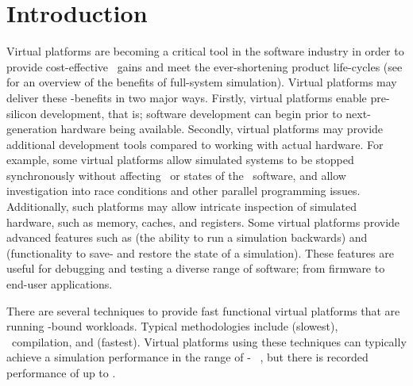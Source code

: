 
\chapter{Introduction}
\label{cha:introduction}

Virtual platforms are becoming a critical tool in the software industry in order to provide cost-effective \dvttermttm\ gains and meet the ever-shortening product life-cycles (see  for an overview of the benefits of full-system simulation).
Virtual platforms may deliver these \dvttermttm -benefits in two major ways.
Firstly, virtual platforms enable pre-silicon development, that is; software development can begin prior to next-generation hardware being available.
Secondly, virtual platforms may provide additional development tools compared to working with actual hardware.
For example, some virtual platforms allow simulated systems to be stopped synchronously without affecting \dvttermtiming\ or states of the \dvttermtarget\ software, and allow investigation into race conditions and other parallel programming issues.
Additionally, such platforms may allow intricate inspection of simulated hardware, such as memory, caches, and registers.
Some virtual platforms provide advanced features such as \dvttermreverseexecution {} (the ability to run a simulation backwards) and \dvttermcheckpointing {} (functionality to save- and restore the state of a simulation).
These features are useful for debugging and testing a diverse range of software; from firmware to end-user applications.

There are several techniques to provide fast functional virtual platforms that are running \dvttermcpu -bound workloads. Typical methodologies include \dvtterminterpretation {} (slowest), \dvttermjit\ compilation, and \dvttermdirectvirtualization {} (fastest).
Virtual platforms using these techniques can typically achieve a simulation performance in the range of - \dvttermmipsecond\ , but there is recorded performance of up to  \dvttermmipsecond {}.\\

